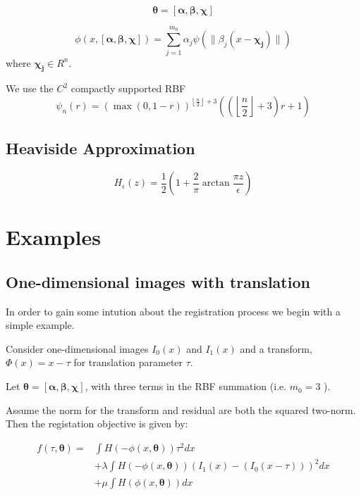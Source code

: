 \documentclass[]{article}
\newcommand{\vect}[1]{\boldsymbol{#1}}
\begin{document}
\begin{equation}
\vect{\theta} = [\vect{\alpha}, \vect{\beta}, \vect{\chi}]
\end{equation} 

\begin{equation}
\phi(x,[\vect{\alpha}, \vect{\beta}, \vect{\chi}]) = \sum_{j = 1}^{m_0} \alpha_j
\psi(\|\beta_j(x - \vect{\chi_j})\|) 
\end{equation}
where \( \vect{\chi_j} \in R^n\).
\par
We use the \(C^2\) compactly supported RBF
\begin{equation}
\psi_{n}(r) = \left ( \max{\left ( 0,1 - r \right )} \right )^{\left\lfloor
  \frac{n}{2}\right\rfloor + 3}\left ( \left ( \left\lfloor
  \frac{n}{2}\right\rfloor + 3 \right ) r+1 \right ) 
\end{equation}

\subsection{Heaviside Approximation}

\begin{equation}
H_\epsilon(z) = \frac{1}{2} \left (  1 + \frac{2}{\pi}
  \arctan{\frac{\pi z}{\epsilon}} \right )
\end{equation}

\section{Examples}

\subsection{One-dimensional images with translation }
In order to gain some intution about the registration process we begin
with a simple example.
\par
Consider one-dimensional images \(I_0(x)\) and \(I_1(x)\) and a
transform, \(\Phi(x) = x - \tau\) for translation parameter \(\tau\).
\par
Let \(\vect{\theta} = [\vect{\alpha}, \vect{\beta}, \vect{\chi}]\), with three terms in the RBF
summation (i.e. \(m_0 = 3\) ).
\par
Assume the norm for the transform and residual are both the squared two-norm.
Then the registation objective is given by:

\begin{eqnarray*}
f(\tau,\vect{\theta}) = & \int H(-\phi(x,\vect{\theta})) \tau^2 dx \\
& + \lambda \int H(-\phi(x,\vect{\theta}))\left (I_1(x) - (I_0(x-\tau)) \right )^2dx \\
& + \mu \int H(\phi(x,\vect{\theta})) dx
\end{eqnarray*}
\end{document}
